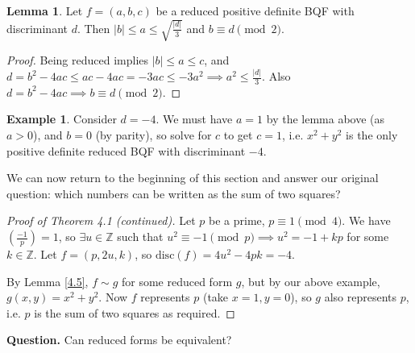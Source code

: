 \documentclass{article}
\theoremstyle{definition}
\newtheorem{lemma}[theorem]{Lemma}
\newtheorem{example}{Example}[section]
\begin{document}

\begin{lemma}\label{4.6}
    Let $f=(a,b,c)$ be a reduced positive definite BQF with discriminant $d$. Then $|b|\le a \le \sqrt{\frac{|d|}{3}}$ and $b \equiv d \pmod{2}$.
\end{lemma}
\begin{proof}
    Being reduced implies $|b|\le a\le c$, and $d = b^2-4ac \le ac -4ac = -3ac \le -3a^2 \implies a^2 \le \frac{|d|}{3}$. Also $d = b^2-4ac \implies b \equiv d \pmod{2}$.
\end{proof}
\begin{example}
    Consider $d = -4$. We must have $a=1$ by the lemma above (as $a>0$), and $b=0$ (by parity), so solve for $c$ to get $c=1$, i.e. $x^2+y^2$ is the only positive definite reduced BQF with discriminant $-4$. 
\end{example}

We can now return to the beginning of this section and answer our original question: which numbers can be written as the sum of two squares?
\begin{proof}[Proof of Theorem 4.1 (continued)]
    Let $p$ be a prime, $p \equiv 1\pmod{4}$. We have $\left(\frac{-1}{p} \right) = 1$, so $\exists u \in \mathbb{Z}$ such that $u^2 \equiv -1 \pmod{p} \implies u^2 = -1 + kp$ for some $k \in \mathbb{Z}$. Let $f = (p,2u,k)$, so $\text{disc}(f) = 4u^2 - 4pk = -4$.
    \vspace{1mm}
    
    By Lemma \ref{4.5}, $f \sim g$ for some reduced form $g$, but by our above example, $g(x,y)= x^2+y^2$. Now $f$ represents $p$ (take $x=1,y=0$), so $g$ also represents $p$, i.e. $p$ is the sum of two squares as required.
\end{proof}
\textbf{Question.} Can reduced forms be equivalent?
\end{document}
